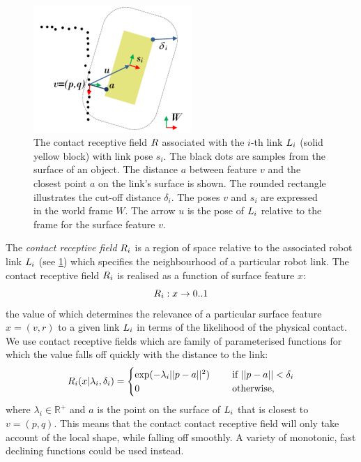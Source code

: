 \begin{figure}[t]
\centerline{\includegraphics[width=6cm]{resources/contact}}
\caption[Contact receptive field]{The contact receptive field $R$ associated with the $i$-th link $L_i$ (solid yellow block) with link pose $s_i$. The black dots are samples from the surface of an object. The distance $a$ between feature $v$ and the closest point $a$ on the link's surface is shown. The rounded rectangle illustrates the cut-off distance $\delta_i$. The poses $v$ and $s_i$ are expressed in the world frame $W$. The arrow $u$ is the pose of $L_i$ relative to the frame for the surface feature $v$.}
\label{fig:contact_recfield}
\end{figure}

The \textit{contact receptive field} $R_i$ is a region of space relative to the associated robot link $L_i$ (see \fig\ref{fig:contact_recfield}) which specifies the neighbourhood of a particular robot link. The contact receptive field $R_i$ is realised as a function of surface feature $x$:
\begin{equation}
R_{i} : x \rightarrow 0..1
\label{eq:contact_recfield_model}
\end{equation}
the value of which determines the relevance of a particular surface feature $x = (v, r)$ to a given link $L_i$ in terms of the likelihood of the physical contact. We use contact receptive fields which are family of parameterised functions for which the value falls off quickly with the distance to the link:
\begin{equation}
R_{i}(x|\lambda_i,\delta_i) = \begin{cases}\exp(-\lambda_i ||p-a||^2) \quad &\textnormal{ if } ||p-a|| < \delta_i\\
0 \quad &\textnormal{ otherwise},\end{cases}
\label{eq:contact_recfield_func}
\end{equation}
where $\lambda_i \in \mathbb R^{+}$ and $a$ is the point on the surface of $L_i$ that is closest to $v = (p, q)$. This means that the contact contact receptive field will only take account of the local shape, while falling off smoothly. A variety of monotonic, fast declining functions could be used instead.


